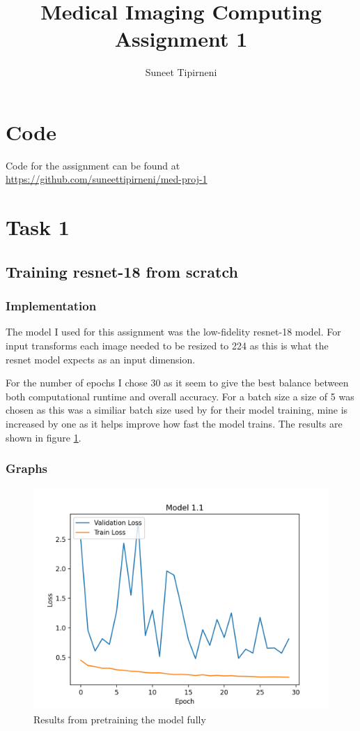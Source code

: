 \documentclass[twocolumn]{article}
\title{Medical Imaging Computing Assignment 1}
\author{Suneet Tipirneni}
\begin{document}
\maketitle
\section{Code}
Code for the assignment can be found at \url{https://github.com/suneettipirneni/med-proj-1}
\section{Task 1} \label{sec:model1}
\subsection{Training resnet-18 from scratch}

\subsubsection{Implementation}

	The model I used for this assignment was the low-fidelity resnet-18 model. For input transforms each image needed to be resized to 224 as this is what the resnet model expects as an input dimension. \par

	For the number of epochs I chose 30 as it seem to give the best balance between both computational runtime and overall accuracy. For a batch size a size of 5 was chosen as this was a similiar batch size used by \cite{transferlearning} for their model training, mine is increased by one as it helps improve how fast the model trains. The results are shown in figure \ref{fig:res1}. 


\subsubsection{Graphs}

\begin{figure}[!htb]
	\centering
	\includegraphics[scale=0.45]{model-1.1.png}
	\caption{Results from pretraining the model fully}
	\label{fig:res1}
\end{figure}
\end{document}
